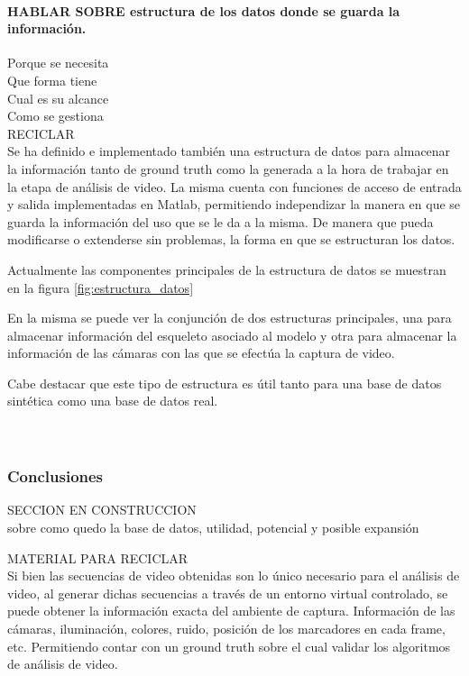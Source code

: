 \paragraph{HABLAR SOBRE estructura de los datos donde se guarda la información.}

Porque se necesita\\
Que forma tiene\\
Cual es su alcance\\
Como se gestiona\\


RECICLAR\\
Se ha definido e implementado también una estructura de datos para almacenar la información tanto de ground truth como la generada a la hora de  trabajar en la etapa de análisis de video. La misma cuenta con funciones de acceso de entrada y salida implementadas en Matlab, permitiendo independizar la manera en que se guarda la información del uso que se le da a la misma. De manera que pueda modificarse o extenderse sin problemas, la forma en que se estructuran los datos.

Actualmente las componentes principales de la estructura de datos se muestran en la figura \ref{fig:estructura_datos}

En la misma se puede ver la conjunción de dos estructuras principales, una para almacenar información del esqueleto asociado al modelo y otra para almacenar la información de las cámaras con las que se efectúa la captura de video.

Cabe destacar que este tipo de estructura es útil tanto para una base de datos sintética como una base de datos real. \\
\\
\\
\subsubsection{Conclusiones} SECCION EN CONSTRUCCION\\
sobre como quedo la base de datos, utilidad, potencial y posible expansión




MATERIAL PARA RECICLAR\\


Si bien las secuencias de video obtenidas son lo único necesario para el análisis de video, al generar dichas secuencias a través de un entorno virtual controlado, se puede obtener la información exacta del ambiente de captura. Información de las cámaras, iluminación, colores, ruido, posición de los marcadores en cada frame, etc. Permitiendo contar con un ground truth sobre el cual validar los algoritmos de análisis de video. 

